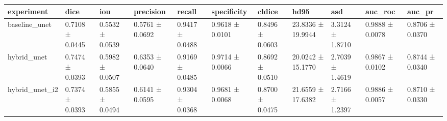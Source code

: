 \begin{tabular}{lllllllllll}
\toprule
experiment & dice & iou & precision & recall & specificity & cldice & hd95 & asd & auc_roc & auc_pr \\
\midrule
baseline_unet & 0.7108 ± 0.0445 & 0.5532 ± 0.0539 & 0.5761 ± 0.0692 & 0.9417 ± 0.0488 & 0.9618 ± 0.0101 & 0.8496 ± 0.0603 & 23.8336 ± 19.9944 & 3.3124 ± 1.8710 & 0.9888 ± 0.0078 & 0.8706 ± 0.0370 \\
hybrid_unet & 0.7474 ± 0.0393 & 0.5982 ± 0.0507 & 0.6353 ± 0.0640 & 0.9169 ± 0.0485 & 0.9714 ± 0.0066 & 0.8692 ± 0.0510 & 20.0242 ± 15.1770 & 2.7039 ± 1.4619 & 0.9867 ± 0.0102 & 0.8744 ± 0.0340 \\
hybrid_unet_i2 & 0.7374 ± 0.0393 & 0.5855 ± 0.0494 & 0.6141 ± 0.0595 & 0.9304 ± 0.0368 & 0.9681 ± 0.0068 & 0.8700 ± 0.0475 & 21.6559 ± 17.6382 & 2.7166 ± 1.2397 & 0.9886 ± 0.0057 & 0.8710 ± 0.0330 \\
\bottomrule
\end{tabular}
